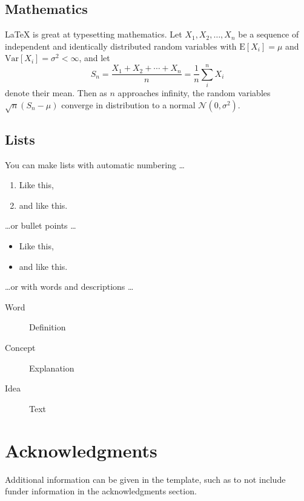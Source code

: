 \documentclass[fleqn,11pt]{olplainarticle}
\begin{document}
\subsection*{Mathematics}

\LaTeX{} is great at typesetting mathematics. Let $X_1, X_2, \ldots, X_n$ be a sequence of independent and identically distributed random variables with $\text{E}[X_i] = \mu$ and $\text{Var}[X_i] = \sigma^2 < \infty$, and let
$$S_n = \frac{X_1 + X_2 + \cdots + X_n}{n}
      = \frac{1}{n}\sum_{i}^{n} X_i$$
denote their mean. Then as $n$ approaches infinity, the random variables $\sqrt{n}(S_n - \mu)$ converge in distribution to a normal $\mathcal{N}(0, \sigma^2)$.

\subsection*{Lists}

You can make lists with automatic numbering \dots

\begin{enumerate}[noitemsep] 
\item Like this,
\item and like this.
\end{enumerate}
\dots or bullet points \dots
\begin{itemize}[noitemsep] 
\item Like this,
\item and like this.
\end{itemize}
\dots or with words and descriptions \dots
\begin{description}
\item[Word] Definition
\item[Concept] Explanation
\item[Idea] Text
\end{description}

\section*{Acknowledgments}

Additional information can be given in the template, such as to not include funder information in the acknowledgments section.


\end{document}
